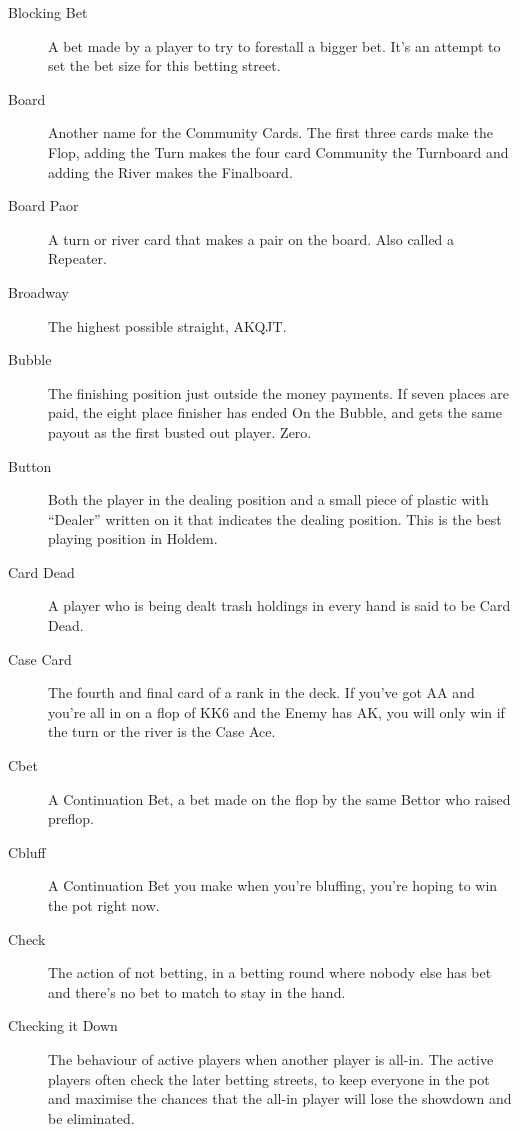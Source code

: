 \begin{description}
\item[Blocking Bet] A bet made by a player to try to forestall a
bigger bet. It's an attempt to set the bet size for this betting
street.

\item[Board] Another name for the Community Cards. The first three
cards make the Flop, adding the Turn makes the four card Community the
Turnboard and adding the River makes the Finalboard.

\item[Board Paor] A turn or river card that makes a pair on the
board. Also called a Repeater.

\item[Broadway] The highest possible straight, AKQJT.

\item[Bubble] The finishing position just outside the money payments.
If seven places are paid, the eight place finisher has ended On the
Bubble, and gets the same payout as the first busted out player. Zero.

\item[Button] Both the player in the dealing position and a small
piece of plastic with ``Dealer'' written on it that indicates the
dealing position. This is the best playing position in Holdem.

\item[Card Dead] A player who is being dealt trash holdings in every
hand is said to be Card Dead.

\item[Case Card] The fourth and final card of a rank in the deck. If
you've got AA and you're all in on a flop of KK6 and the Enemy has AK,
you will only win if the turn or the river is the Case Ace.

\item[Cbet] A Continuation Bet, a bet made on the flop by the same Bettor
who raised preflop.

\item[Cbluff] A Continuation Bet you make when you're bluffing, you're
hoping to win the pot right now.

\item[Check] The action of not betting, in a betting round where
nobody else has bet and there's no bet to match to stay in the hand.

\item[Checking it Down] The behaviour of active players when another
player is all-in. The active players often check the later betting
streets, to keep everyone in the pot and maximise the chances that the
all-in player will lose the showdown and be eliminated.


\end{description}

